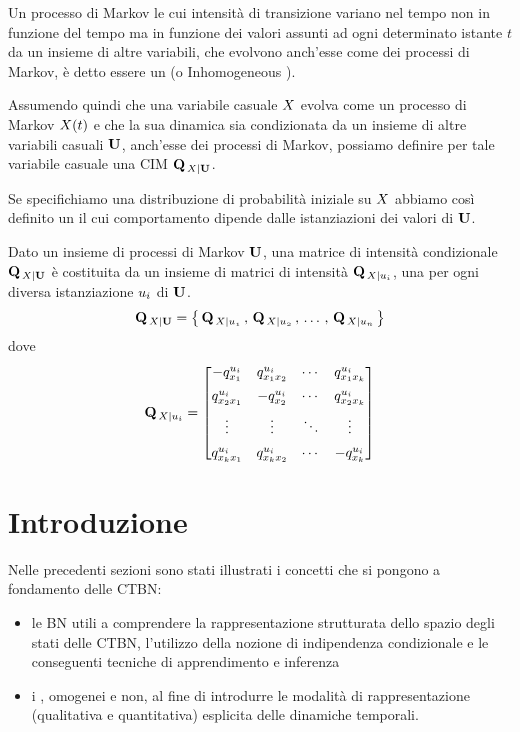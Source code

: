 \begin{definizione}[\conm\mprocess]
\label{defn:conditional-markov-process}
Un processo di Markov le cui intensità di transizione variano nel tempo non in funzione del tempo ma in funzione dei valori assunti ad ogni determinato istante $t$ da un insieme di altre variabili, che evolvono anch'esse come dei processi di Markov, è detto essere un \conm\mprocess{} (o Inhomogeneous \mprocess{}).

Assumendo quindi che una variabile casuale $\mathnormal{X}$ evolva come un processo di Markov $\mathnormal{X}(t)$ e che la sua dinamica sia condizionata da un insieme di altre variabili casuali $\mathbf{U}$, anch'esse dei processi di Markov, possiamo definire per tale variabile casuale una \acf{CIM} $\mathbf{Q}_{\,\mathnormal{X}|\mathbf{U}}$.

Se specifichiamo una distribuzione di probabilità iniziale su $\mathnormal{X}$ abbiamo così definito un \mprocess{} il cui comportamento dipende dalle istanziazioni dei valori di $\mathbf{U}$.
\end{definizione}

\begin{definizione}
\label{defn:cim}
Dato un insieme di processi di Markov $\mathbf{U}$, una matrice di intensità condizionale $\mathbf{Q}_{\,\mathnormal{X}|\mathbf{U}}$ è costituita da un insieme di matrici di intensità $\mathbf{Q}_{\,\mathnormal{X}|\mathnormal{u_i}}$, una per ogni diversa istanziazione $\mathnormal{u_i}$ di $\mathbf{U}$.
\[
\mathbf{Q}_{\,\mathnormal{X}|\mathbf{U}}=\big\{\,\mathbf{Q}_{\,\mathnormal{X}|\mathnormal{u_1}}\,,\,\mathbf{Q}_{\,\mathnormal{X}|\mathnormal{u_2}}\,,\,\dotsc\,,\,\mathbf{Q}_{\,\mathnormal{X}|\mathnormal{u_n}}\,\big\}
\]
dove\\
\[
\mathbf{Q}_{\,\mathnormal{X}|u_i}
    =  \begin{bmatrix}
        -q_{x_1}^{u_i}   & q_{x_1x_2}^{u_i} & \cdots & q_{x_1x_k}^{u_i}\\[0.5em]
        q_{x_2x_1}^{u_i} & -q_{x_2}^{u_i}   & \cdots & q_{x_2x_k}^{u_i}\\[0.5em]
        \vdots           & \vdots           & \ddots & \vdots          \\[0.5em]
        q_{x_kx_1}^{u_i} & q_{x_kx_2}^{u_i} & \cdots & -q_{x_k}^{u_i}
    \end{bmatrix}
\]
\end{definizione} 

\section{Introduzione}
\label{sec:introduzione}
Nelle precedenti sezioni sono stati illustrati i concetti che si pongono a fondamento delle \acl{CTBN}:
\begin{itemize}
    \item le \acl{BN} utili a comprendere la rappresentazione strutturata dello spazio degli stati delle \acs{CTBN}, l'utilizzo della nozione di indipendenza condizionale e le conseguenti tecniche di apprendimento e inferenza
    \item i \mprocess{}, omogenei e non, al fine di introdurre le modalità di rappresentazione (qualitativa e quantitativa) esplicita delle dinamiche temporali.
\end{itemize}

